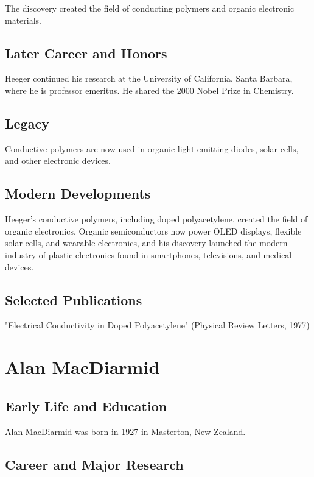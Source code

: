 The discovery created the field of conducting polymers and organic electronic materials.

\subsection*{Later Career and Honors}

Heeger continued his research at the University of California, Santa Barbara, where he is professor emeritus. He shared the 2000 Nobel Prize in Chemistry.

\subsection*{Legacy}

Conductive polymers are now used in organic light-emitting diodes, solar cells, and other electronic devices.

\subsection*{Modern Developments}

Heeger's conductive polymers, including doped polyacetylene, created the field of organic electronics. Organic semiconductors now power OLED displays, flexible solar cells, and wearable electronics, and his discovery launched the modern industry of plastic electronics found in smartphones, televisions, and medical devices.

\subsection*{Selected Publications}

"Electrical Conductivity in Doped Polyacetylene" (Physical Review Letters, 1977)

\clearpage

\section{Alan MacDiarmid}

\subsection*{Early Life and Education}

Alan MacDiarmid was born in 1927 in Masterton, New Zealand.

\subsection*{Career and Major Research}

